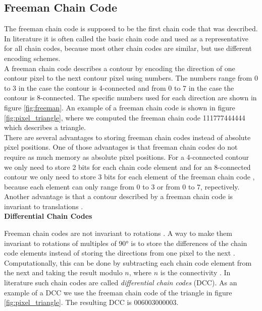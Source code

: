 \documentclass[thesis.tex]{subfiles}
\begin{document}
\subsection{Freeman Chain Code} \label{freeman}
The freeman chain code \cite{freeman} is supposed to be the first chain code that was described. In literature it is often called the basic chain code and used as a representative for all chain codes, because most other chain codes are similar, but use different encoding schemes. \\ A freeman chain code describes a contour by encoding the direction of one contour pixel to the next contour pixel using numbers. The numbers range from 0 to 3 in the case the contour is 4-connected and from 0 to 7 in the case the contour is 8-connected. The specific numbers used for each direction are shown in figure \ref{fig:freeman}. An example of a freeman chain code is shown in figure \ref{fig:pixel_triangle}, where we computed the freeman chain code 111777444444 which describes a triangle. \\  
There are several advantages to storing freeman chain codes instead of absolute pixel positions. One of those advantages is that freeman chain codes do not require as much memory as absolute pixel positions. For a 4-connected contour we only need to store 2 bits for each chain code element and for an 8-connected contour we only need to store 3 bits for each element of the freeman chain code \cite{Ballard:1982:CV:578131}, because each element can only range from 0 to 3 or from 0 to 7, repectively. Another advantage is that a contour described by a freeman chain code is invariant to translations \cite{yang2008su}. \\

\textbf{Differential Chain Codes}

 Freeman chain codes are not invariant to rotations \cite{yang2008su,Ballard:1982:CV:578131}. A way to make them invariant to rotations of multiples of 90\si{\degree} is to store the differences of the chain code elements instead of storing the directions from one pixel to the next  \cite{yang2008su}. Computationally, this can be done by subtracting each chain code element from the next and taking the result modulo $n$, where $n$ is the connectivity \cite{yang2008su}. In literature such chain codes are called \textit{differential chain codes} (DCC). As an example of a DCC we use the freeman chain code of the triangle in figure \ref{fig:pixel_triangle}. The resulting DCC is 006003000003.\\
\end{document}

